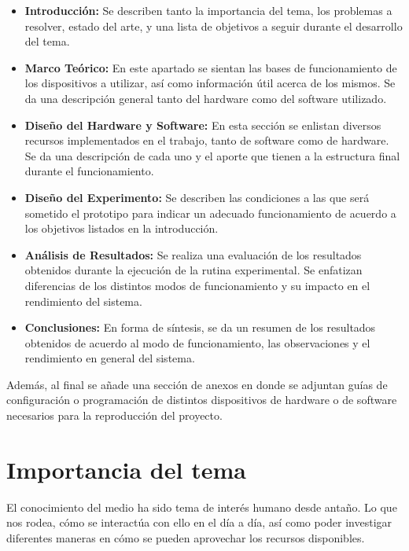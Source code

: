 \begin{itemize}
\item \textbf{Introducción:} Se describen tanto la importancia del tema, los problemas a resolver, estado del arte, y una lista de objetivos a seguir durante el desarrollo del tema.\\
\item \textbf{Marco Teórico:} En este apartado se sientan las bases de funcionamiento de los dispositivos a utilizar, así como información útil acerca de los mismos. Se da una descripción general tanto del hardware como del software utilizado.\\
\item \textbf{Diseño del Hardware y Software:} En esta sección se enlistan diversos recursos implementados en el trabajo, tanto de software como de hardware. Se da una descripción de cada uno y el aporte que tienen a la estructura final durante el funcionamiento.\\
\item \textbf{Diseño del Experimento:} Se describen las condiciones a las que será sometido el prototipo para indicar un adecuado funcionamiento de acuerdo a los objetivos listados en la introducción.\\
\item \textbf{Análisis de Resultados:} Se realiza una evaluación de los resultados obtenidos durante la ejecución de la rutina experimental. Se enfatizan diferencias de los distintos modos de funcionamiento y su impacto en el rendimiento del sistema.\\
\item \textbf{Conclusiones:} En forma de síntesis, se da un resumen de los resultados obtenidos de acuerdo al modo de funcionamiento, las observaciones  y el rendimiento en general del sistema.\\
\end{itemize}

Además, al final se añade una sección de anexos en donde se adjuntan guías de configuración o programación de distintos dispositivos de hardware o de software necesarios para la reproducción del proyecto. 

\section{Importancia del tema}
El conocimiento del medio ha sido tema de interés humano desde antaño. Lo que nos rodea, cómo se interactúa con ello en el día a día, así como poder investigar diferentes maneras en cómo se pueden aprovechar los recursos disponibles. \\

